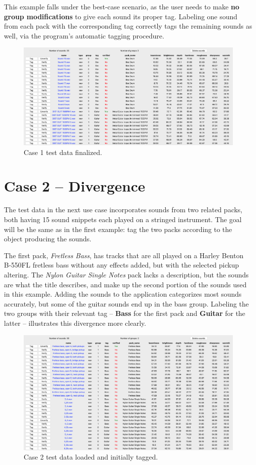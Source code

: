 This example falls under the best-case scenario, as the user needs to make \textbf{no group modifications} to give each sound its proper tag. Labeling one sound from each pack with the corresponding tag correctly tags the remaining sounds as well, via the program's automatic tagging procedure.
\begin{figure}[ht]
    \includegraphics[width=\textwidth]{figures/case_1/finalized}
    \caption{Case 1 test data finalized.}\label{fig:case_1/finalized}
\end{figure}
\clearpage

\newpage\section{Case 2 – Divergence}
The test data in the next use case incorporates sounds from two related packs, both having 15 sound snippets each played on a stringed instrument. The goal will be the same as in the first example: tag the two packs according to the object producing the sounds.

The first pack, \emph{Fretless Bass}, has tracks that are all played on a Harley Benton B-550FL fretless bass without any effects added, but with the selected pickup altering. The \emph{Nylon Guitar Single Notes} pack lacks a description, but the sounds are what the title describes, and make up the second portion of the sounds used in this example. Adding the sounds to the application categorizes most sounds accurately, but some of the guitar sounds end up in the bass group. Labeling the two groups with their relevant tag – \textbf{Bass} for the first pack and \textbf{Guitar} for the latter – illustrates this divergence more clearly.
\begin{figure}[ht]
    \includegraphics[width=\textwidth]{figures/case_2/initial}
    \caption{Case 2 test data loaded and initially tagged.}\label{fig:case_2/initial}
\end{figure}

